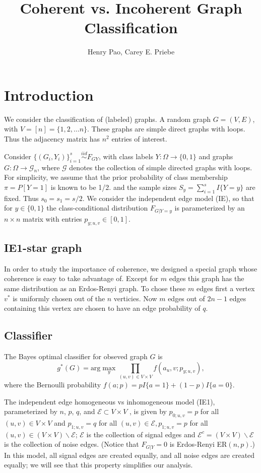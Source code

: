 \documentclass{article}
\title{Coherent vs. Incoherent Graph Classification}
\author{Henry Pao, Carey E. Priebe}
\begin{document}
\maketitle

\begin{abstract}

\end{abstract}


\section{Introduction}
We consider the classification of (labeled) graphs. A random graph $G=(V, E)$, with $V=[n]=\{1,2,\ldots n\}$. These graphs are simple direct graphs with loops. Thus the adjacency matrix has $n^2$ entries of interest. 

Consider $\{(G_i, Y_i)\}^s_{i=1}\mathop{\sim}\limits^{iid}F_{GY}$, with class labels $Y:\Omega\rightarrow\{0,1\}$ and graphs $G:\Omega \rightarrow\mathcal{G}_n$, where $\mathcal{G}$ denotes the collection of simple directed graphs with loops. For simplicity, we assume that the prior probability of class membership $\pi = P[Y=1]$ is known to be 1/2. and the sample sizes $S_y = \sum_{i=1}^s I\{Y=y\}$ are fixed. Thus $s_0 = s_1 = s/2$. We consider the independent edge model (IE), so that for $y\in\{0, 1\}$ the class-conditional distribution $F_{G|Y=y}$ is parameterized by an $n\times n$ matrix with entries $p_{y;u,v}\in[0,1]$.

\subsection{IE1-star graph}
In order to study the importance of coherence, we designed a special graph whose coherence is easy to take advantage of. Except for $m$ edges this graph has the same distribution as an Erdos-Renyi graph. To chose these $m$ edges first a vertex $v^*$ is uniformly chosen out of the $n$ verticies. Now $m$ edges out of $2n-1$ edges containing this vertex are chosen to have an edge probability of $q$.

\subsection{Classifier}
The Bayes optimal classifier for obseved graph $G$ is 
\[
g^*(G) = \textrm{arg}\max_y \prod_{(u,v)\in V\times V} f(a_u,v;p_{y;u,v}),
\]
where the Bernoulli probability $f(a;p) = pI\{a=1\} +(1-p)I\{a=0\}$.

The independent edge homogeneous vs inhomogeneous model (IE1), parameterized by $n$, $p$, $q$, and $\mathcal{E}\subset V \times V$ , is given by $p_{0;u,v} = p$ for all $(u, v) \in V \times V$ and $p_{1;u,v} = q$ for all $(u, v) \in \mathcal{E}, p_{1;u,v} = p$ for all $(u, v) \in (V \times V ) \backslash \mathcal{E}$; $\mathcal{E}$ is the collection of signal edges and $\mathcal{E}^c = (V \times V ) \backslash \mathcal{E}$ is the collection of noise edges. (Notice that $F_{G|Y} =0$ is Erdos-Renyi ER$(n, p)$.) In this model, all signal edges are created equally, and all noise edges are created equally; we will see that this property simplifies our analysis.
\end{document}
